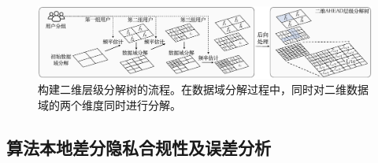         

\begin{figure}[t]
    \centering
    \includegraphics[width=\hsize]{figure/ldp_range_query/figures_others/GridAHEAD_workflow2ch.pdf.pdf}
    \vspace{-0.7cm}
    \caption{
    \myahead 构建二维层级分解树的流程。在数据域分解过程中，\myahead 同时对二维数据域的两个维度同时进行分解。}
    \vspace{-0.4cm}
    \label{Multi-dimensional tree}
\end{figure}

\subsection{算法本地差分隐私合规性及误差分析}
\label{Privacy and Utility Analysis}

